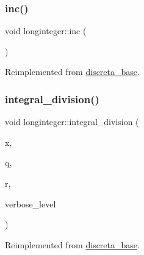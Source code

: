 \mbox{\label{classlonginteger_aac69c9779c9fed275a1cbae4314438e5}} 
\subsubsection{\texorpdfstring{inc()}{inc()}}
{\footnotesize\ttfamily void longinteger\+::inc (\begin{DoxyParamCaption}{ }\end{DoxyParamCaption})\hspace{0.3cm}{\ttfamily [virtual]}}



Reimplemented from \mbox{\hyperlink{classdiscreta__base_afda42789f4ba04ba399623a6b9e206e3}{discreta\+\_\+base}}.

\mbox{\label{classlonginteger_a692f761cfc91770ca40ab5c2df4bd358}} 
\subsubsection{\texorpdfstring{integral\+\_\+division()}{integral\_division()}}
{\footnotesize\ttfamily void longinteger\+::integral\+\_\+division (\begin{DoxyParamCaption}\item[{\mbox{\hyperlink{classdiscreta__base}{discreta\+\_\+base}} \&}]{x,  }\item[{\mbox{\hyperlink{classdiscreta__base}{discreta\+\_\+base}} \&}]{q,  }\item[{\mbox{\hyperlink{classdiscreta__base}{discreta\+\_\+base}} \&}]{r,  }\item[{\mbox{\hyperlink{galois_8h_a09fddde158a3a20bd2dcadb609de11dc}{I\+NT}}}]{verbose\+\_\+level }\end{DoxyParamCaption})\hspace{0.3cm}{\ttfamily [virtual]}}



Reimplemented from \mbox{\hyperlink{classdiscreta__base_a92b3001ac35af9185b316c0d8f89070e}{discreta\+\_\+base}}.

\mbox{\label{classlonginteger_ab60c9e3b2f28caf83f3b13d6f3a9ec54}} 
